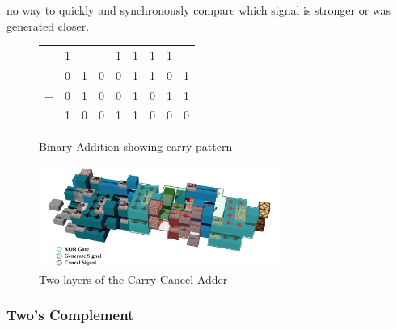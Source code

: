 no way to quickly and synchronously compare which signal is stronger or was generated closer.

\begin{figure}[!h]
    \begin{center}
        \begin{tabular}{ccccccccc}
            & \tiny{1} & & & \tiny{1} & \tiny{1} & \tiny{1} & \tiny{1} & \\
            & 0 & 1 & 0 & 0 & 1 & 1 & 0 & 1 \\
            + & 0 & 1 & 0 & 0 & 1 & 0 & 1 & 1 \\
            \hline
            & 1 & 0 & 0 & 1 & 1 & 0 & 0 & 0\\
        \end{tabular}
    \end{center}
    \caption[Carry pattern addition]{Binary Addition showing carry pattern}
    \label{fig::AdditionExampleCCA}
\end{figure}

\begin{figure}[!h]
    \begin{center}
        \includegraphics[width=0.7\textwidth]{Figures/CCA.png}
        \caption[Carry Cancel Adder]{Two layers of the Carry Cancel Adder}
        \label{fig::CCA}
    \end{center}
\end{figure}

\subsubsection{Two's Complement}

